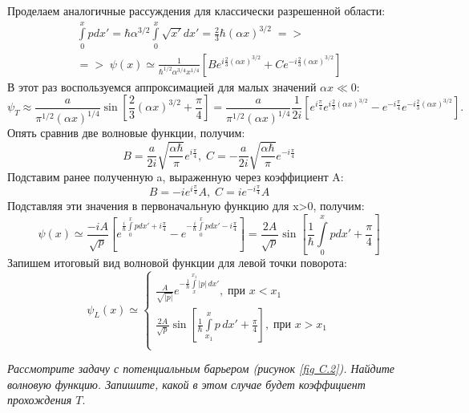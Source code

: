 Проделаем аналогичные рассуждения для классически разрешенной области:
\begin{gather*}
\int\limits_{0}^{x} p dx' = \hbar\alpha^{3/2} \int\limits_{0}^{x}\sqrt{x'} dx' = \frac{2}{3}\hbar(\alpha x)^{3/2}\; =>\\
=>\; \psi(x) \simeq \frac{1}{\hbar^{1/2}\alpha^{3/4}x^{1/4}}\left[ Be^{i\frac{2}{3}(\alpha x)^{3/2}} + Ce^{-i\frac{2}{3}(\alpha x)^{3/2}} \right]
\end{gather*}
В этот раз воспользуемся аппроксимацией для малых значений $\alpha x \ll 0$:
\[
\psi_T \approx \frac{a}{\pi^{1/2}(\alpha x)^{1/4}}\sin\left[\frac{2}{3}(\alpha x)^{3/2} + \frac{\pi}{4}\right] = \frac{a}{\pi^{1/2}(\alpha x)^{1/4}}\frac{1}{2i}\left[ e^{i\frac{\pi}{4}}e^{i\frac{2}{3}(\alpha x)^{3/2}} - e^{-i\frac{\pi}{4}}e^{-i\frac{2}{3}(\alpha x)^{3/2}} \right].
\]
Опять сравнив две волновые функции, получим:
\[
B = \frac{a}{2i}\sqrt{\frac{\alpha\hbar}{\pi}}e^{i\frac{\pi}{4}},\; C = -\frac{a}{2i}\sqrt{\frac{\alpha\hbar}{\pi}}e^{-i\frac{\pi}{4}}
\]
Подставим ранее полученную a, выраженную через коэффициент A:
\[
B = -ie^{i\frac{\pi}{4}}A,\; C = ie^{-i\frac{\pi}{4}}A
\]
Подставляя эти значения в первоначальную функцию для x>0, получим:
\[
\psi(x) \simeq \frac{-iA}{\sqrt{p}}\left[ e^{\frac{i}{\hbar}\int\limits_{0}^{x} p dx' + i\frac{\pi}{4}} - e^{-\frac{i}{\hbar}\int\limits_{0}^{x} p dx' - i\frac{\pi}{4}} \right] = \frac{2A}{\sqrt{p}}\sin\left[ \frac{1}{\hbar} \int\limits_0^{x}p dx' + \frac{\pi}{4} \right]
\]
Запишем итоговый вид волновой функции для левой точки поворота:
\[
\psi_L(x) \simeq 
\begin{cases}
    \frac{A}{\sqrt{|p|}}e^{-\frac{1}{\hbar} \int\limits_{x}^{x_1} |p|\,dx'},\; \text{при } x < x_1\\
    \frac{2A}{\sqrt{p}}\sin\left[ \frac{1}{\hbar} \int\limits_{x_1}^{x} p\,dx' + \frac{\pi}{4} \right], \; \text{при } x > x_1\\
\end{cases}
\]
\newpage
{}
\begin{center}
\textit{Рассмотрите задачу с потенциальным барьером (рисунок \ref{fig C.2}). Найдите волновую функцию. Запишите, какой в этом случае будет коэффициент прохождения $T$}.
\end{center}

